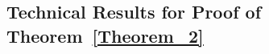 \documentclass[twoside,11pt]{article}
\begin{document}









    
\subsection{Technical Results for Proof of Theorem~\ref{Theorem_2}}
\end{document}
